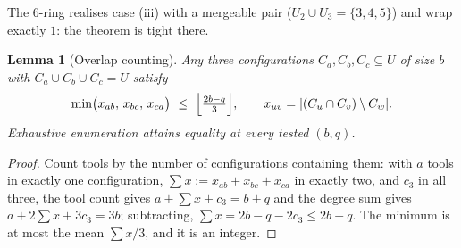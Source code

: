 \documentclass[11pt,a4paper]{article}
\theoremstyle{plain}
\newtheorem{lemma}[theorem]{Lemma}
\theoremstyle{definition}
\begin{document}
\noindent The $6$-ring realises case (iii) with a mergeable pair ($U_2\cup U_3=
\{3,4,5\}$) and wrap exactly $1$: the theorem is tight there.


\begin{thmbox}
\begin{lemma}[Overlap counting]
\label{lem:overlap}
Any three configurations $C_a,C_b,C_c\subseteq U$ of size $b$ with
$C_a\cup C_b\cup C_c=U$ satisfy
\[
  \min\bigl(x_{ab},\,x_{bc},\,x_{ca}\bigr)\ \le\
  \Bigl\lfloor\tfrac{2b-q}{3}\Bigr\rfloor,
  \qquad x_{uv}=\lvert(C_u\cap C_v)\setminus C_w\rvert .
\]
Exhaustive enumeration attains equality at every tested $(b,q)$.
\end{lemma}
\end{thmbox}
\begin{proofbox}
\begin{proof}
Count tools by the number of configurations containing them: with $a$ tools in
exactly one configuration, $\sum x:=x_{ab}+x_{bc}+x_{ca}$ in exactly two, and
$c_3$ in all three, the tool count gives $a+\sum x+c_3=b+q$ and the degree sum
gives $a+2\sum x+3c_3=3b$; subtracting, $\sum x=2b-q-2c_3\le2b-q$. The minimum is
at most the mean $\sum x/3$, and it is an integer.
\end{proof}
\end{proofbox}
\end{document}
